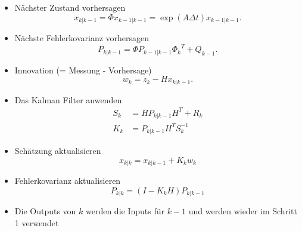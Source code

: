\begin{itemize}
\item Nächster Zustand vorhersagen
\[
{x_{k|k-1}}=\Phi{x_{k-1|k-1}}= \exp(A\Delta t){x_{k-1|k-1}}.
\] 

 \item Nächste Fehlerkovarianz vorhersagen
\[
{P_{k|k-1}}=\Phi {P_{k-1|k-1}} {\Phi _{k}}^T + {Q_{k-1}}.
\] 

\item Innovation (= Messung -  Vorhersage)
\[
{w_{k}}={z_{k}}-{H}{x_{k|k-1}}.
\] 

\item Das Kalman Filter anwenden
\begin{align*}
{S_{k}} &={H}{P_{k|k-1}}{H}^T+{R_{k}}\\
{K_{k}} &= {P_{k|k-1}} {H^T}{S_{k}^{-1}}
\end{align*}

\item Schätzung aktualisieren
\[
{x_{k|k}}={x_{k|k-1}}+{K_{k}}{w_{k}}
\] 

\item Fehlerkovarianz aktualisieren
\[
{P_{k|k}}=(I-{K_{k}}{H}){P_{k|k-1}}
\] 

\item Die Outputs von $k$ werden die Inputs für ${k-1}$ und werden wieder im Schritt 1 verwendet
\end{itemize}

